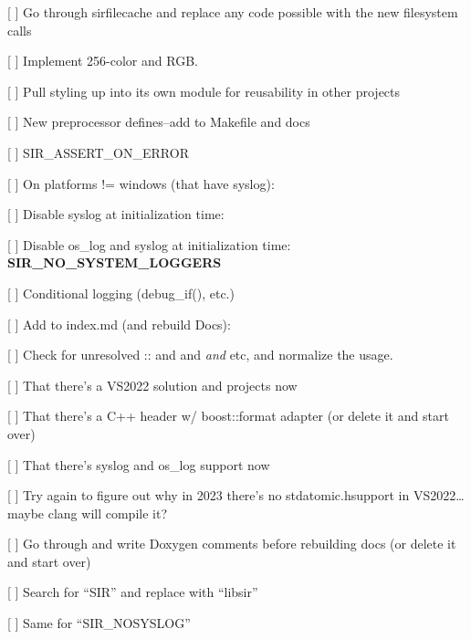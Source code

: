 \begin{DoxyItemize}
\item \mbox{[} \mbox{]} Go through sirfilecache and replace any code possible with the new filesystem calls
\begin{DoxyItemize}
\item \mbox{[} \mbox{]} Implement 256-\/color and RGB.
\item \mbox{[} \mbox{]} Pull styling up into its own module for reusability in other projects
\end{DoxyItemize}
\item \mbox{[} \mbox{]} New preprocessor defines–add to Makefile and docs
\begin{DoxyItemize}
\item \mbox{[} \mbox{]} SIR\+\_\+\+ASSERT\+\_\+\+ON\+\_\+\+ERROR
\item \mbox{[} \mbox{]} On platforms != windows (that have syslog)\+:
\begin{DoxyItemize}
\item \mbox{[} \mbox{]} Disable syslog at initialization time\+:
\item \mbox{[} \mbox{]} Disable os\+\_\+log and syslog at initialization time\+: {\bfseries{SIR\+\_\+\+NO\+\_\+\+SYSTEM\+\_\+\+LOGGERS}}
\end{DoxyItemize}
\item \mbox{[} \mbox{]} Conditional logging (debug\+\_\+if(), etc.)
\end{DoxyItemize}
\item \mbox{[} \mbox{]} Add to index.\+md (and rebuild Docs)\+:
\begin{DoxyItemize}
\item \mbox{[} \mbox{]} Check for unresolved \+:: and and {\itshape and} {\ttfamily etc}, and normalize the usage.
\item \mbox{[} \mbox{]} That there’s a VS2022 solution and projects now
\item \mbox{[} \mbox{]} That there’s a C++ header w/ boost\+::format adapter (or delete it and start over)
\item \mbox{[} \mbox{]} That there’s {\ttfamily syslog} and {\ttfamily os\+\_\+log} support now
\end{DoxyItemize}
\item \mbox{[} \mbox{]} Try again to figure out why in 2023 there’s no {\ttfamily stdatomic.\+h}support in VS2022… maybe clang will compile it?
\item \mbox{[} \mbox{]} Go through  and write Doxygen comments before rebuilding docs (or delete it and start over)
\begin{DoxyItemize}
\item \mbox{[} \mbox{]} Search for “\+SIR” and replace with “libsir”
\item \mbox{[} \mbox{]} Same for “\+SIR\+\_\+\+NOSYSLOG” 
\end{DoxyItemize}
\end{DoxyItemize}